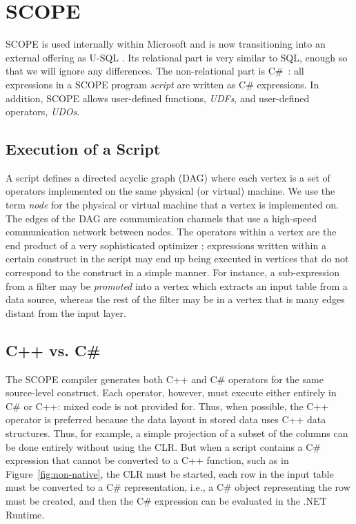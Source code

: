 \section{SCOPE \label{sec:Scope}}

SCOPE \cite{} is used internally within Microsoft and is now transitioning into an external offering as U-SQL \cite{}.
Its relational part is very similar to SQL, enough so that we will ignore any differences.
The non-relational part is C\#~\cite{}: all expressions in a SCOPE program {\it script} are written as C\# expressions.
In addition, SCOPE allows user-defined functions, {\em UDFs}, and user-defined operators, {\em UDOs}.

\subsection{Execution of a Script}
A script defines a directed acyclic graph (DAG) where each vertex is a set of operators implemented on the same physical (or virtual) machine. We use the term {\it node} for the physical or virtual machine that a vertex is implemented on.
The edges of the DAG are communication channels that use a high-speed communication network between nodes.
The operators within a vertex are the end product of a very sophisticated optimizer \cite{}; expressions written within a certain construct in the script may end up being executed in vertices that do not correspond to the construct in a simple manner.
For instance, a sub-expression from a filter may be {\it promoted} into a vertex which extracts an input table from a data source, whereas the rest of the filter may be in a vertex that is many edges distant from the input layer.

\subsection{C++ vs. C\#}
The SCOPE compiler generates both C++ and C\# operators for the same source-level construct.
Each operator, however, must execute either entirely in C\# or C++: mixed code is not provided for.
Thus, when possible, the C++ operator is preferred because the data layout in stored data uses C++ data structures.
Thus, for example, a simple projection of a subset of the columns can be done entirely
without using the CLR.
But when a script contains a C\# expression that cannot be converted to a C++ function, such as in Figure~\ref{fig:non-native}, the CLR must be started, each row in the input table must be converted to a C\# representation, i.e., a C\# object representing the row must be created, and then the C\# expression can be evaluated in the .NET Runtime.

